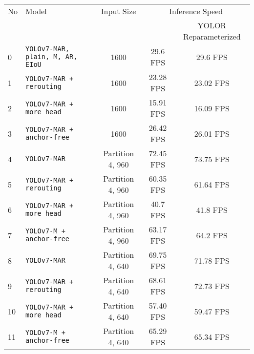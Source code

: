 \begin{tabular}{ l l c c c}
  \toprule[1.5pt]
  No & Model                                       &   Input Size         &\multicolumn{2}{c}{Inference Speed}          \\
     &                                             &                      &                     & \footnotesize{YOLOR Reparameterized} \\
  \midrule
  0  & \texttt{YOLOv7-MAR, plain, M, AR, EIoU}     &      1600            & 29.6 FPS            & 29.6 FPS   \\
  1  & \texttt{YOLOv7-MAR + rerouting}             &      1600            & 23.28 FPS           & 23.02 FPS   \\
  2  & \texttt{YOLOv7-MAR + more head}             &      1600            & 15.91 FPS           & 16.09 FPS   \\
  3  & \texttt{YOLOv7-MAR + anchor-free}           &      1600            & 26.42 FPS           & 26.01 FPS   \\
  \midrule
  4  & \texttt{YOLOv7-MAR}                         &  Partition 4, 960    & 72.45 FPS           & 73.75 FPS  \\
  5  & \texttt{YOLOv7-MAR + rerouting}             &  Partition 4, 960    & 60.35 FPS           & 61.64 FPS  \\
  6  & \texttt{YOLOv7-MAR + more head}             &  Partition 4, 960    & 40.7 FPS            & 41.8 FPS  \\
  7  & \texttt{YOLOv7-M + anchor-free}             &  Partition 4, 960    & 63.17 FPS           & 64.2 FPS   \\
  \midrule
  8  & \texttt{YOLOv7-MAR}                         &  Partition 4, 640    & 69.75 FPS           & 71.78 FPS  \\
  9  & \texttt{YOLOv7-MAR + rerouting}             &  Partition 4, 640    & 68.61 FPS           & 72.73 FPS  \\
  10 & \texttt{YOLOv7-MAR + more head}             &  Partition 4, 640    & 57.40 FPS           & 59.47 FPS  \\
  11 & \texttt{YOLOv7-M + anchor-free}             &  Partition 4, 640    & 65.29 FPS           & 65.34 FPS \\
  \bottomrule[1.5pt]
\end{tabular}